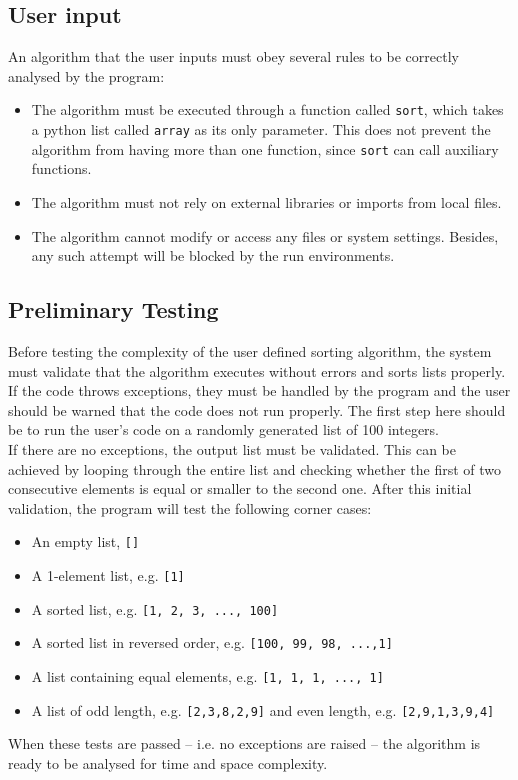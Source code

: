 \documentclass{article}
\begin{document}
        \subsection{User input}
            An algorithm that the user inputs must obey several rules to be correctly analysed by the program:
            \begin{itemize}
                \item The algorithm must be executed through a function called \verb|sort|, which takes a python list called \verb|array| as its only parameter. This does not prevent the algorithm from having more than one function, since \verb|sort| can call auxiliary functions.
                \item The algorithm must not rely on external libraries or imports from local files.
                \item The algorithm cannot modify or access any files or system settings. Besides, any such attempt will be blocked by the run environments.
            \end{itemize}
        
        \subsection{Preliminary Testing}
            Before testing the complexity of the user defined sorting algorithm, the system must validate that the algorithm executes without errors and sorts lists properly. If the code throws exceptions, they must be handled by the program and the user should be warned that the code does not run properly. The first step here should be to run the user's code on a randomly generated list of 100 integers.\\
            
            If there are no exceptions, the output list must be validated. This can be achieved by looping through the entire list and checking whether the first of two consecutive elements is equal or smaller to the second one. After this initial validation, the program will test the following corner cases:
            \begin{itemize}
                \item An empty list, \verb|[]|
                \item A 1-element list, e.g. \verb|[1]|
                \item A sorted list, e.g. \verb|[1, 2, 3, ..., 100]|
                \item A sorted list in reversed order, e.g. \verb|[100, 99, 98, ...,1]|
                \item A list containing equal elements, e.g. \verb|[1, 1, 1, ..., 1]|
                \item A list of odd length, e.g. \verb|[2,3,8,2,9]| and even length, e.g. \verb|[2,9,1,3,9,4]|
            \end{itemize}
            When these tests are passed – i.e. no exceptions are raised – the algorithm is ready to be analysed for time and space complexity.
            
\end{document}
